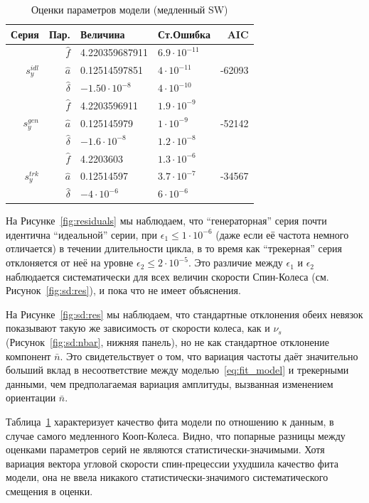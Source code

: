 \begin{table}[h]\centering
	\caption{Оценки параметров модели (медленный SW)\label{tbl:param_estimates}}
	\begin{tabular}{r|rllr}
		\toprule
		Серия & Пар. & Величина & Ст.Ошибка & AIC \\
		\midrule
		\multirow{3}{*}{$s_y^{idl}$}
		& $\hat f$ & 4.220359687911 & $6.9\cdot10^{-11}$ & \multirow{3}{*}{-62093} \\
		& $\hat a$ & 0.12514597851 & $4\cdot10^{-11}$ & \\
		& $\hat\delta$ & $-1.50\cdot10^{-8}$ & $4\cdot 10^{-10}$ &\\
		\hline
		\multirow{3}{*}{$s_y^{gen}$}
		& $\hat f$ & 4.2203596911 & $1.9\cdot 10^{-9}$ & \multirow{3}{*}{-52142} \\
		& $\hat a$ & 0.125145979 & $1\cdot 10^{-9}$ & \\
		& $\hat\delta$ & $-1.6\cdot 10^{-8}$ & $1.2\cdot 10^{-8}$ &\\
		\hline
		\multirow{3}{*}{$s_y^{trk}$}
		& $\hat f$ & 4.2203603 & $1.3\cdot 10^{-6}$ & \multirow{3}{*}{-34567} \\
		& $\hat a$ & 0.12514597 & $3.7\cdot10^{-7}$ & \\
		& $\hat\delta$ & $-4\cdot10^{-6}$ & $6\cdot 10^{-6}$ &\\
		\bottomrule
	\end{tabular}
\end{table}


На Рисунке~\ref{fig:residuals} мы наблюдаем, что ``генераторная'' серия почти идентична
``идеальной'' серии, при $\epsilon_1 \le 1\cdot10^{-6}$ (даже если её частота немного отличается) в течении длительности цикла,
в то время как ``трекерная'' серия отклоняется от неё на уровне
$\epsilon_2 \le 2\cdot 10^{-5}$.  Это различие между $\epsilon_1$ и $\epsilon_2$ наблюдается
систематически для всех величин скорости Спин-Колеса (см. Рисунок~\ref{fig:sd:res}), и пока что не имеет объяснения.

На Рисунке~\ref{fig:sd:res} мы наблюдаем, что стандартные отклонения обеих невязок показывают такую же зависимость от скорости колеса, как и $\nu_s$ (Рисунок~\ref{fig:sd:nbar}, нижняя панель), но не как стандартное отклонение компонент $\bar n$.
Это свидетельствует о том, что вариация частоты даёт значительно больший вклад в несоответствие между
моделью~\eqref{eq:fit_model} и трекерными данными, чем предполагаемая вариация амплитуды, вызванная изменением ориентации $\bar n$.

Таблица~\ref{tbl:param_estimates} характеризует качество фита модели по отношению к данным,
в случае самого медленного Кооп-Колеса.
Видно, что попарные разницы между оценками параметров серий не являются статистически-значимыми. Хотя вариация вектора угловой скорости спин-прецессии ухудшила качество фита модели, она не ввела никакого статистически-значимого систематического смещения в оценки.


